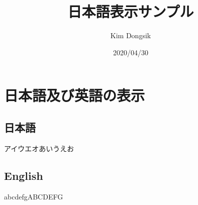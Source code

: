 \documentclass[a4paper]{bxjsarticle}
\title{日本語表示サンプル}
\author{Kim Dongsik}
\date{2020/04/30}
\begin{document}
\pagestyle{headings}
\maketitle


\section{日本語及び英語の表示}
\subsection{日本語}
アイウエオあいうえお
\subsection{English}
abcdefgABCDEFG
\end{document}
